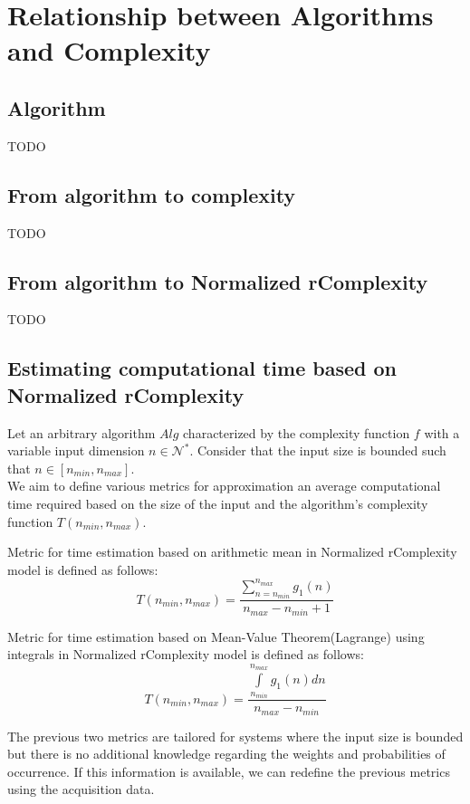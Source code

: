 \chapter{Relationship between Algorithms and Complexity}


\section{Algorithm}
TODO

\section{From algorithm to complexity}
TODO

\section{From algorithm to Normalized rComplexity}
TODO

\section{Estimating computational time based on Normalized rComplexity}
Let an arbitrary algorithm $Alg$ characterized by the complexity function $f$ with a variable input dimension $n \in \mathcal{N}^{*}$. Consider that the input size is bounded such that $n \in [n_{min}, n_{max}]$. \\
We aim to define various metrics for approximation an average computational time required based on the size of the input and the algorithm's complexity function  $T(n_{min}, n_{max})$.\\

\begin{definition} Metric for time estimation based on arithmetic mean in Normalized rComplexity model is defined as follows:
\[  T(n_{min}, n_{max}) = \dfrac{\sum\limits_{n=n_{min}}^{n_{max}} g_{1}(n)}{n_{max} - n_{min} + 1}  \]
\end{definition}

\begin{definition} Metric for time estimation based on Mean-Value Theorem(Lagrange) using integrals in Normalized rComplexity model is defined as follows:
\[  T(n_{min}, n_{max}) = \dfrac{\int\limits_{n_{min}}^{n_{max}} g_{1}(n) dn}{n_{max} - n_{min}}  \]
\end{definition}

The previous two metrics are tailored for systems where the input size is bounded but there is no additional knowledge regarding the weights and probabilities of occurrence. If this information is available, we can redefine the previous metrics using the acquisition data.


